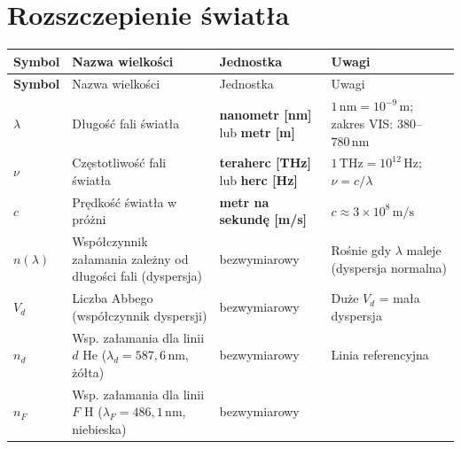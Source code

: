 \documentclass[12pt,a4paper]{article}
\begin{document}
\section{Rozszczepienie światła}

\begin{longtable}{>{\bfseries}p{1.6cm} p{6.5cm} p{3.2cm} p{3.5cm}}
\toprule
\rowcolor{headercolor}
\color{white}Symbol &
\color{white}Nazwa wielkości &
\color{white}Jednostka &
\color{white}Uwagi \\
\midrule
\endfirsthead
\toprule
\rowcolor{headercolor}
\color{white}Symbol &
\color{white}Nazwa wielkości &
\color{white}Jednostka &
\color{white}Uwagi \\
\midrule
\endhead
\bottomrule
\endfoot

\rowcolor{rowrozs}
$\lambda$ & Długość fali światła
        & \textbf{nanometr [nm]} lub \textbf{metr [m]}
        & $1\,\mathrm{nm} = 10^{-9}\,\mathrm{m}$;
          zakres VIS: $380$--$780\,\mathrm{nm}$ \\

\rowcolor{rowrozs}
$\nu$   & Częstotliwość fali światła
        & \textbf{teraherc [THz]} lub \textbf{herc [Hz]}
        & $1\,\mathrm{THz} = 10^{12}\,\mathrm{Hz}$;
          $\nu = c/\lambda$ \\

\rowcolor{rowrozs}
$c$     & Prędkość światła w próżni
        & \textbf{metr na sekundę [m/s]}
        & $c \approx 3\times10^8\,\mathrm{m/s}$ \\

\rowcolor{rowrozs}
$n(\lambda)$ & Współczynnik załamania zależny od
               długości fali (dyspersja)
        & bezwymiarowy
        & Rośnie gdy $\lambda$ maleje
          (dyspersja normalna) \\

\rowcolor{rowrozs}
$V_d$   & Liczba Abbego (współczynnik dyspersji)
        & bezwymiarowy
        & Duże $V_d$ = mała dyspersja \\

\rowcolor{rowrozs}
$n_d$   & Wsp. załamania dla linii $d$ He
          ($\lambda_d = 587{,}6\,\mathrm{nm}$, żółta)
        & bezwymiarowy
        & Linia referencyjna \\

\rowcolor{rowrozs}
$n_F$   & Wsp. załamania dla linii $F$ H
          ($\lambda_F = 486{,}1\,\mathrm{nm}$, niebieska)
        & bezwymiarowy
        & \\


\end{longtable}
\end{document}
